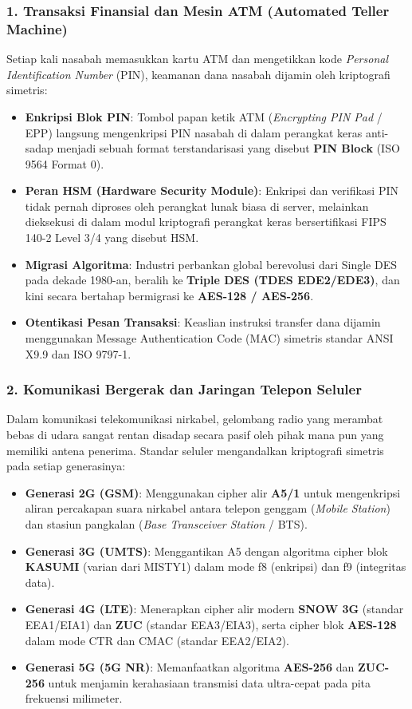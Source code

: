 \subsubsection{1. Transaksi Finansial dan Mesin ATM (Automated Teller Machine)}

Setiap kali nasabah memasukkan kartu ATM dan mengetikkan kode \textit{Personal Identification Number} (PIN), keamanan dana nasabah dijamin oleh kriptografi simetris:
\begin{itemize}
  \item \textbf{Enkripsi Blok PIN}: Tombol papan ketik ATM (\textit{Encrypting PIN Pad} / EPP) langsung mengenkripsi PIN nasabah di dalam perangkat keras anti-sadap menjadi sebuah format terstandarisasi yang disebut \textbf{PIN Block} (ISO 9564 Format 0).
  \item \textbf{Peran HSM (Hardware Security Module)}: Enkripsi dan verifikasi PIN tidak pernah diproses oleh perangkat lunak biasa di server, melainkan dieksekusi di dalam modul kriptografi perangkat keras bersertifikasi FIPS 140-2 Level 3/4 yang disebut HSM.
  \item \textbf{Migrasi Algoritma}: Industri perbankan global berevolusi dari Single DES pada dekade 1980-an, beralih ke \textbf{Triple DES (TDES EDE2/EDE3)}, dan kini secara bertahap bermigrasi ke \textbf{AES-128 / AES-256}.
  \item \textbf{Otentikasi Pesan Transaksi}: Keaslian instruksi transfer dana dijamin menggunakan Message Authentication Code (MAC) simetris standar ANSI X9.9 dan ISO 9797-1.
\end{itemize}

\subsubsection{2. Komunikasi Bergerak dan Jaringan Telepon Seluler}

Dalam komunikasi telekomunikasi nirkabel, gelombang radio yang merambat bebas di udara sangat rentan disadap secara pasif oleh pihak mana pun yang memiliki antena penerima. Standar seluler mengandalkan kriptografi simetris pada setiap generasinya:
\begin{itemize}
  \item \textbf{Generasi 2G (GSM)}: Menggunakan cipher alir \textbf{A5/1} untuk mengenkripsi aliran percakapan suara nirkabel antara telepon genggam (\textit{Mobile Station}) dan stasiun pangkalan (\textit{Base Transceiver Station} / BTS).
  \item \textbf{Generasi 3G (UMTS)}: Menggantikan A5 dengan algoritma cipher blok \textbf{KASUMI} (varian dari MISTY1) dalam mode f8 (enkripsi) dan f9 (integritas data).
  \item \textbf{Generasi 4G (LTE)}: Menerapkan cipher alir modern \textbf{SNOW 3G} (standar EEA1/EIA1) dan \textbf{ZUC} (standar EEA3/EIA3), serta cipher blok \textbf{AES-128} dalam mode CTR dan CMAC (standar EEA2/EIA2).
  \item \textbf{Generasi 5G (5G NR)}: Memanfaatkan algoritma \textbf{AES-256} dan \textbf{ZUC-256} untuk menjamin kerahasiaan transmisi data ultra-cepat pada pita frekuensi milimeter.
\end{itemize}

